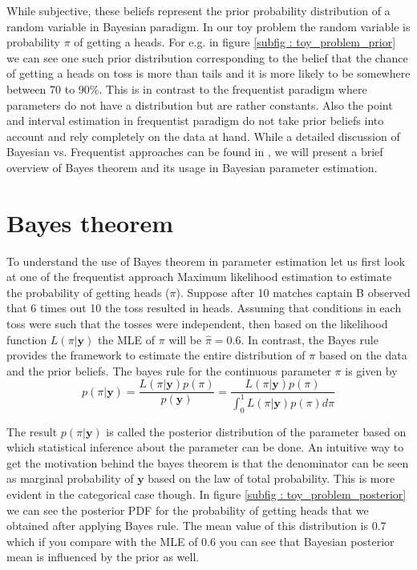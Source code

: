 While subjective, these beliefs represent the prior probability distribution of a random variable in Bayesian paradigm. In our toy problem the random variable is probability $\pi$ of getting a heads. For e.g. in figure \ref{subfig : toy_problem_prior} we can see one such prior distribution corresponding to the belief that the chance of getting a heads on toss is more than tails and it is more likely to be somewhere between 70 to 90\%. This is in contrast to the frequentist paradigm where parameters do not have a distribution but are rather constants. Also the point and interval estimation in frequentist paradigm do not take prior beliefs into account and rely completely on the data at hand. While a detailed discussion of Bayesian vs. Frequentist approaches can be found in \citet{lesaffre_bayesian_2012}, we will present a brief overview of Bayes theorem and its usage in Bayesian parameter estimation.\\

\section{Bayes theorem}
\label{sec : bayes_theorem}
To understand the use of Bayes theorem in parameter estimation let us first look at one of the frequentist approach Maximum likelihood estimation to estimate the probability of getting heads ($\pi$). Suppose after 10 matches captain B observed that 6 times out 10 the toss resulted in heads. Assuming that conditions in each toss were such that the tosses were independent, then based on the likelihood function $L(\pi|\boldsymbol{y})$ the MLE of $\pi$ will be $\hat{\pi} = 0.6$. In contrast, the Bayes rule provides the framework to estimate the entire distribution of $\pi$ based on the data and the prior beliefs. The bayes rule for the continuous parameter $\pi$ is given by\\

\begin{equation}
\label{eq : bayes_rule}
p(\pi|\boldsymbol{y}) = \dfrac{L(\pi|\boldsymbol{y})p(\pi)}{p(\boldsymbol{y})} = \dfrac{L(\pi|\boldsymbol{y})p(\pi)}{\int_{0}^{1}L(\pi|\boldsymbol{y})p(\pi)d\pi}
\end{equation}

The result $p(\pi|\boldsymbol{y})$ is called the posterior distribution of the parameter based on which statistical inference about the parameter can be done. An intuitive way to get the motivation behind the bayes theorem is that the denominator can be seen as marginal probability of $\boldsymbol{y}$ based on the law of total probability. This is more evident in the categorical case though. In figure \ref{subfig : toy_problem_posterior} we can see the posterior PDF for the probability of getting heads that we obtained after applying Bayes rule. The mean value of this distribution is 0.7 which if you compare with the MLE of 0.6 you can see that Bayesian posterior mean is influenced by the prior as well.\\


